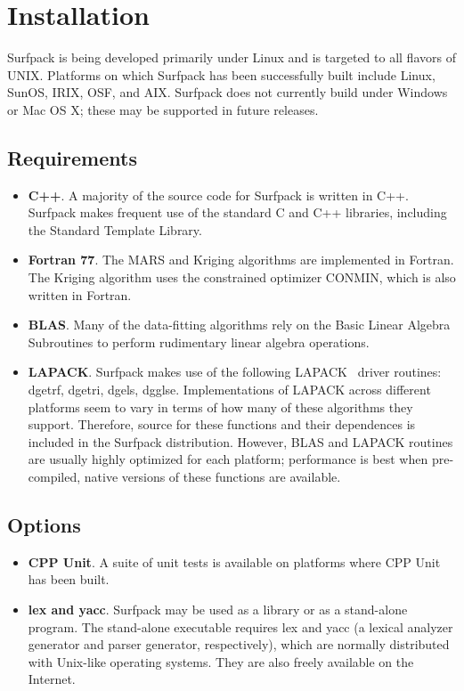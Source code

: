 \documentclass{article}
\begin{document}
\section{Installation}\label{sec:installation}
Surfpack is being developed primarily under Linux and is targeted to all flavors of UNIX.  Platforms on which Surfpack has been successfully built include Linux, SunOS, IRIX, OSF, and AIX.  Surfpack does not currently build under Windows or Mac OS X; these may be supported in future releases.
\subsection{Requirements}
\begin{itemize}
\item {\bf C++}.  A majority of the source code for Surfpack is written in C++.  Surfpack makes frequent use of the standard C and C++ libraries, including the Standard Template Library.
\item {\bf Fortran 77}.  The MARS and Kriging algorithms are implemented in Fortran.  The Kriging algorithm uses the constrained optimizer CONMIN, which is also written in Fortran.  
\item {\bf BLAS}.  Many of the data-fitting algorithms rely on the Basic Linear Algebra Subroutines to perform rudimentary linear algebra operations.
\item {\bf LAPACK}.  Surfpack makes use of the following LAPACK~\cite{anderson}  driver routines: dgetrf, dgetri, dgels, dgglse.  Implementations of LAPACK across different platforms seem to vary in terms of how many of these algorithms they support.  Therefore, source for these functions and their dependences is included in the Surfpack distribution.  However, BLAS and LAPACK routines are usually highly optimized for each platform; performance is best when pre-compiled, native versions of these functions are available.
\end{itemize}
\subsection{Options}
\begin{itemize}
\item {\bf CPP Unit}.  A suite of unit tests is available on platforms where CPP Unit has been built.
\item {\bf lex and yacc}. Surfpack may be used as a library or as a stand-alone program.  The stand-alone executable requires lex and yacc (a lexical analyzer generator and parser generator, respectively), which are normally distributed with Unix-like operating systems.  They are also freely available on the Internet.
\end{itemize}
\end{document}
